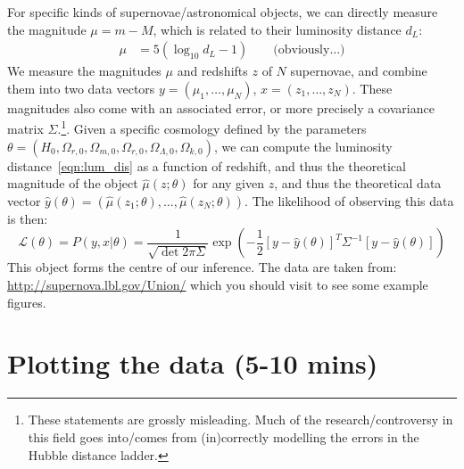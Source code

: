 \documentclass{article}
\begin{document}
For specific kinds of supernovae/astronomical objects, we can directly measure the magnitude $\mu=m-M$, which is related to their luminosity distance $d_L$:
\begin{align}
    \mu &= 5( \log_{10} d_L - 1) \qquad\text{(obviously\ldots)}
    \label{eqn:mag}
\end{align}
We measure the magnitudes $\mu$ and redshifts $z$ of $N$ supernovae, and combine them into two data vectors $y = (\mu_1,\ldots,\mu_N)$, $x=(z_1,\ldots,z_N)$. These magnitudes also come with an associated error, or more precisely a covariance matrix $\Sigma$.\footnote{These statements are grossly misleading. Much of the research/controversy in this field goes into/comes from (in)correctly modelling the errors in the Hubble distance ladder.}.
Given a specific cosmology defined by the parameters $\theta = (H_0, \Omega_{r,0},\Omega_{m,0},\Omega_{r,0},\Omega_{\Lambda,0},\Omega_{k,0})$, we can compute the luminosity distance~\eqref{eqn:lum_dis} as a function of redshift, and thus the theoretical magnitude of the object $\hat{\mu}(z;\theta)$ for any given $z$, and thus the theoretical data vector $\hat{y}(\theta) = (\hat{\mu}(z_1;\theta),\ldots,\hat{\mu}(z_N;\theta))$. The likelihood of observing this data is then:
\begin{equation}
    \mathcal{L}(\theta) = P(y,x|\theta) = \frac{1}{\sqrt{\det 2\pi \Sigma}} \exp{\left( -\frac{1}{2}[y-\hat{y}(\theta)]^T \Sigma^{-1}[y-\hat{y}(\theta)] \right)}
    \label{eqn:gaussian_likelihood}
\end{equation}
This object forms the centre of our inference. The data are taken from:
\url{http://supernova.lbl.gov/Union/}
\noindent{}which you should visit to see some example figures.



\section{Plotting the data (5-10 mins)}
\end{document}
